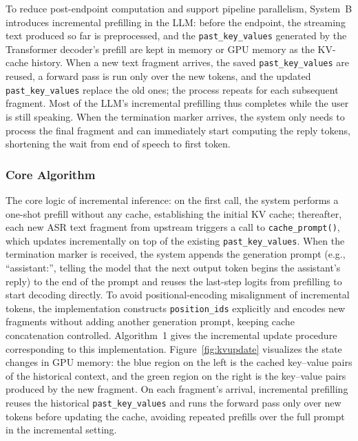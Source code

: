 \documentclass[a4paper,11pt]{article}
\begin{document}
To reduce post-endpoint computation and support pipeline parallelism, System~B introduces incremental prefilling in the LLM: before the endpoint, the streaming text produced so far is preprocessed, and the \texttt{past\_key\_values} generated by the Transformer decoder's prefill are kept in memory or GPU memory as the KV-cache history. When a new text fragment arrives, the saved \texttt{past\_key\_values} are reused, a forward pass is run only over the new tokens, and the updated \texttt{past\_key\_values} replace the old ones; the process repeats for each subsequent fragment. Most of the LLM's incremental prefilling thus completes while the user is still speaking. When the termination marker arrives, the system only needs to process the final fragment and can immediately start computing the reply tokens, shortening the wait from end of speech to first token.

\subsubsection{Core Algorithm}

The core logic of incremental inference: on the first call, the system performs a one-shot prefill without any cache, establishing the initial KV cache; thereafter, each new ASR text fragment from upstream triggers a call to \texttt{cache\_prompt()}, which updates incrementally on top of the existing \texttt{past\_key\_values}. When the termination marker is received, the system appends the generation prompt (e.g., ``assistant:'', telling the model that the next output token begins the assistant's reply) to the end of the prompt and reuses the last-step logits from prefilling to start decoding directly. To avoid positional-encoding misalignment of incremental tokens, the implementation constructs \texttt{position\_ids} explicitly and encodes new fragments without adding another generation prompt, keeping cache concatenation controlled. Algorithm~1 gives the incremental update procedure corresponding to this implementation. Figure~\ref{fig:kvupdate} visualizes the state changes in GPU memory: the blue region on the left is the cached key--value pairs of the historical context, and the green region on the right is the key--value pairs produced by the new fragment. On each fragment's arrival, incremental prefilling reuses the historical \texttt{past\_key\_values} and runs the forward pass only over new tokens before updating the cache, avoiding repeated prefills over the full prompt in the incremental setting.
\end{document}
